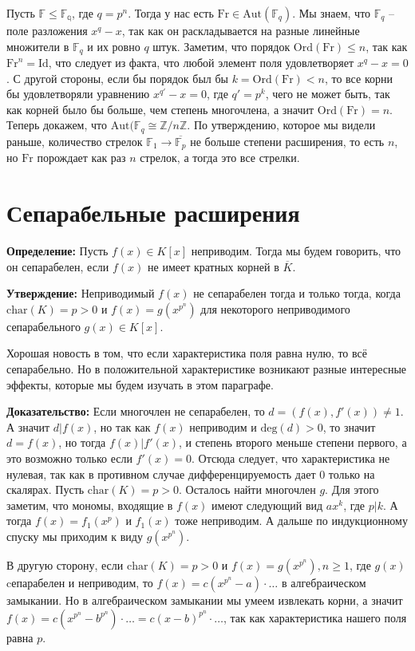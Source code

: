 \documentclass[a4paper, 12pt]{book}
\begin{document}
Пусть $\mathbb{F}\leq\mathbb{F_q}$, где $q=p^n$. Тогда у нас есть $\text{Fr}\in
\text{Aut}(\mathbb{F}_q)$. Мы знаем, что $\mathbb{F}_q$ – поле разложения $x^q-
x$, так как он раскладывается на разные линейные множители в $\mathbb{F}_q$ и
их ровно $q$ штук. Заметим, что порядок $\text{Ord}(\text{Fr})\leq n$, так
как $\text{Fr}^n=\text{Id}$, что следует из факта, что любой элемент поля
удовлетворяет $x^q-x=0$. С другой стороны, если бы порядок был бы $k=\text{Ord}
(\text{Fr})<n$, то все корни бы удовлетворяли уравнению $x^{q'}-x=0$, где $q'=p^k$,
чего не может быть, так как корней было бы больше, чем степень многочлена, а
значит $\text{Ord}(\text{Fr})=n$. Теперь докажем, что $\text{Aut}(\mathbb{F}_q
\cong\mathbb{Z}/n\mathbb{Z}$. По утверждению, которое мы видели раньше,
количество стрелок $\mathbb{F}_1\rightarrow\overline{\mathbb{F}_p}$ не больше
степени расширения, то есть $n$, но $\text{Fr}$ порождает как раз $n$ стрелок,
а тогда это все стрелки.

\section{Сепарабельные расширения}
\textbf{Определение:} Пусть $f(x)\in K[x]$ неприводим. Тогда мы будем говорить,
что он сепарабелен, если $f(x)$ не имеет кратных корней в $\overline{K}$.

\textbf{Утверждение:} Неприводимый $f(x)$ не сепарабелен тогда и только тогда,
когда $\text{char}(K)=p>0$ и $f(x)=g(x^{p^n})$ для некоторого неприводимого
сепарабельного $g(x)\in K[x]$.

Хорошая новость в том, что если характеристика поля равна нулю, то всё
сепарабельно. Но в положительной характеристике возникают разные интересные
эффекты, которые мы будем изучать в этом параграфе.

\textbf{Доказательство:} Если многочлен не сепарабелен, то $d = (f(x), f'(x))
\neq 1$. А значит $d | f(x)$, но так как $f(x)$ неприводим и $\text{deg}(d)>0$,
то значит $d=f(x)$, но тогда $f(x) | f'(x)$, и степень второго меньше степени
первого, а это возможно только если $f'(x)=0$. Отсюда следует, что характеристика
не нулевая, так как в противном случае дифференцируемость дает 0 только на
скалярах. Пусть $\text{char}(K)=p>0$. Осталось найти многочлен $g$. Для этого
заметим, что мономы, входящие в $f(x)$ имеют следующий вид $ax^k$, где $p|k$.
А тогда $f(x)=f_1(x^p)$ и $f_1(x)$ тоже неприводим. А дальше по индукционному
спуску мы приходим к виду $g(x^{p^n})$.

В другую сторону, если $\text{char}(K)=p>0$ и $f(x)=g(x^{p^n}), n\geq 1$, где
$g(x)$ cепарабелен и неприводим, то $f(x)=c(x^{p^n}-a)\cdot\ldots$ в алгебраическом
замыкании. Но в алгебраическом замыкании мы умеем извлекать корни, а значит
$f(x)=c(x^{p^n}-b^{p^n})\cdot\ldots=c(x-b)^{p^n}\cdot\ldots$, так как
характеристика нашего поля равна $p$.
\end{document}
